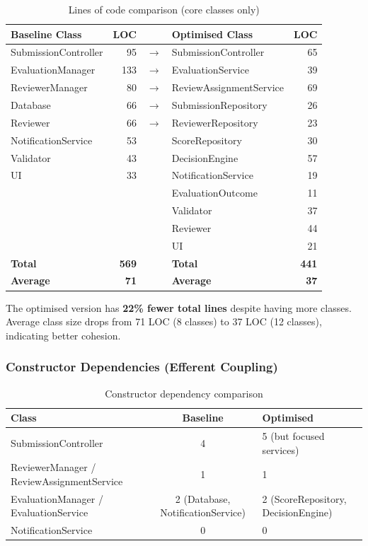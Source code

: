\documentclass[12pt, a4paper]{article}
\begin{document}
\begin{table}[h]
\centering
\caption{Lines of code comparison (core classes only)}
\label{tab:loc}
\begin{tabular}{l r c l r}
    \toprule
    \textbf{Baseline Class} & \textbf{LOC} & & \textbf{Optimised Class} & \textbf{LOC} \\
    \midrule
    SubmissionController & 95 & $\rightarrow$ & SubmissionController & 65 \\
    EvaluationManager & 133 & $\rightarrow$ & EvaluationService & 39 \\
    ReviewerManager & 80 & $\rightarrow$ & ReviewAssignmentService & 69 \\
    Database & 66 & $\rightarrow$ & SubmissionRepository & 26 \\
    Reviewer & 66 & $\rightarrow$ & ReviewerRepository & 23 \\
    NotificationService & 53 & & ScoreRepository & 30 \\
    Validator & 43 & & DecisionEngine & 57 \\
    UI & 33 & & NotificationService & 19 \\
    & & & EvaluationOutcome & 11 \\
    & & & Validator & 37 \\
    & & & Reviewer & 44 \\
    & & & UI & 21 \\
    \midrule
    \textbf{Total} & \textbf{569} & & \textbf{Total} & \textbf{441} \\
    \textbf{Average} & \textbf{71} & & \textbf{Average} & \textbf{37} \\
    \bottomrule
\end{tabular}
\end{table}

The optimised version has \textbf{22\% fewer total lines} despite having more classes. Average class size drops from 71 LOC (8 classes) to 37 LOC (12 classes), indicating better cohesion.

\subsubsection{Constructor Dependencies (Efferent Coupling)}

\begin{table}[h]
\centering
\caption{Constructor dependency comparison}
\label{tab:coupling}
\begin{tabularx}{\textwidth}{l c X}
    \toprule
    \textbf{Class} & \textbf{Baseline} & \textbf{Optimised} \\
    \midrule
    SubmissionController & 4 & 5 (but focused services) \\
    ReviewerManager / ReviewAssignmentService & 1 & 1 \\
    EvaluationManager / EvaluationService & 2 (Database, NotificationService) & 2 (ScoreRepository, DecisionEngine) \\
    NotificationService & 0 & 0 \\
    \bottomrule
\end{tabularx}
\end{table}
\end{document}
